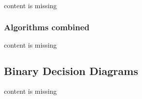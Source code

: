 content is missing

\subsubsection{Algorithms combined}

content is missing

\subsection{Binary Decision Diagrams}

content is missing



%
%
%



%
%
%


%
%
%
%

